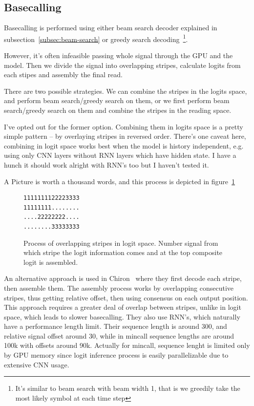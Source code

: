 \documentclass[times, utf8, diplomski, english]{fer}
\begin{document}
\subsection{Basecalling}
\label{subsec:basecalling}

Basecalling is performed using either beam search decoder explained in subsection~\ref{subsec:beam-search} or greedy search 
decoding~\footnote{It's similar to beam search with beam width 1, that is we greedily take the most likely symbol at each time step}.

However, it's often infeasible passing whole signal through the GPU and the model. 
Then we divide the signal into overlapping stripes, calculate logits from each stipes and assembly the final read. 

There are two possible strategies. We can combine the stripes in the logits space, and perform beam search/greedy search on them, 
or we first perform beam search/greedy search on them and combine the stripes in the reading space. 

I've opted out for the former option. 
Combining them in logits space is a pretty simple pattern -- by overlaying stripes in reversed order.
There's one caveat here, combining in logit space works best when the model is history independent, e.g.
using only CNN layers without RNN layers which have hidden state. I have a hunch it should work alright with RNN's too but I haven't tested it.

A Picture is worth a thousand words, and this process is depicted in figure~\ref{fg:logit_comp}

\begin{figure}
\begin{center}
\begin{verbatim}
1111111122223333
11111111........
....22222222....
........33333333
\end{verbatim}
\end{center}
\caption{Process of overlapping stripes in logit space. Number signal from which stripe the logit information comes and at the top composite logit is assembled.}
\label{fg:logit_comp}
\end{figure}

An alternative approach is used in Chiron~\citep{chiron_teng} where they first decode each stripe, then assemble them. 
The assembly process works by overlapping consecutive stripes, thus getting relative offset, then using consensus on each output position.
This approach requires a greater deal of overlap between stripes, unlike in logit space, which leads to slower basecalling.
They also use RNN's, which naturally have a performance length limit. 
Their sequence length is around 300, and relative signal offset around 30, 
while in mincall sequence lengths are around 100k with offsets around 90k. Actually for mincall, sequence lenght is limited only by GPU memory since logit inference process is easily parallelizable due to extensive CNN usage. 
\end{document}
